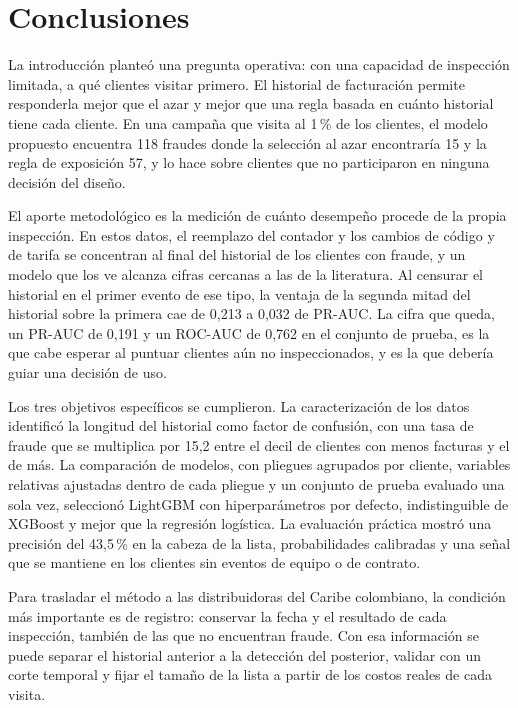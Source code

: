 \section{Conclusiones}\label{sec:conclusiones}

La introducción planteó una pregunta operativa: con una capacidad de inspección limitada, a
qué clientes visitar primero. El historial de facturación permite responderla mejor que el
azar y mejor que una regla basada en cuánto historial tiene cada cliente. En una campaña que
visita al 1\,\% de los clientes, el modelo propuesto encuentra 118 fraudes donde la selección
al azar encontraría 15 y la regla de exposición 57, y lo hace sobre clientes que no participaron
en ninguna decisión del diseño.

El aporte metodológico es la medición de cuánto desempeño procede de la propia inspección. En
estos datos, el reemplazo del contador y los cambios de código y de tarifa se concentran al
final del historial de los clientes con fraude, y un modelo que los ve alcanza cifras cercanas
a las de la literatura. Al censurar el historial en el primer evento de ese tipo, la ventaja
de la segunda mitad del historial sobre la primera cae de 0,213 a 0,032 de PR-AUC. La cifra
que queda, un PR-AUC de 0,191 y un ROC-AUC de 0,762 en el conjunto de prueba, es la que cabe
esperar al puntuar clientes aún no inspeccionados, y es la que debería guiar una decisión de
uso.

Los tres objetivos específicos se cumplieron. La caracterización de los datos identificó la
longitud del historial como factor de confusión, con una tasa de fraude que se multiplica por
15,2 entre el decil de clientes con menos facturas y el de más. La comparación de modelos, con
pliegues agrupados por cliente, variables relativas ajustadas dentro de cada pliegue y un
conjunto de prueba evaluado una sola vez, seleccionó LightGBM con hiperparámetros por defecto,
indistinguible de XGBoost y mejor que la regresión logística. La evaluación práctica mostró una
precisión del 43,5\,\% en la cabeza de la lista, probabilidades calibradas y una señal que se
mantiene en los clientes sin eventos de equipo o de contrato.

Para trasladar el método a las distribuidoras del Caribe colombiano, la condición más
importante es de registro: conservar la fecha y el resultado de cada
inspección, también de las que no encuentran fraude. Con esa información se puede separar el
historial anterior a la detección del posterior, validar con un corte temporal y fijar el
tamaño de la lista a partir de los costos reales de cada visita.
